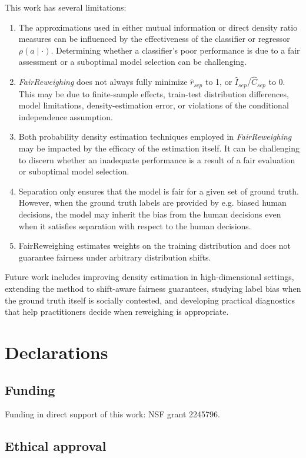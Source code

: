 This work has several limitations:
\begin{enumerate}[label=\textbf{Limitation \arabic*}]
\item The approximations used in either mutual information or direct density ratio measures can be influenced by the effectiveness of the classifier or regressor $\rho(a \mid \cdot)$. Determining whether a classifier's poor performance is due to a fair assessment or a suboptimal model selection can be challenging.
\item \emph{FairReweighing} does not always fully minimize $\hat{r}_{sep}$ to 1, or $\hat{I}_{sep}$/$\hat{C}_{sep}$ to 0. This may be due to finite-sample effects, train-test distribution differences, model limitations, density-estimation error, or violations of the conditional independence assumption.
\item Both probability density estimation techniques employed in \emph{FairReweighing} may be impacted by the efficacy of the estimation itself. It can be challenging to discern whether an inadequate performance is a result of a fair evaluation or suboptimal model selection.
\item Separation only ensures that the model is fair for a given set of ground truth. However, when the ground truth labels are provided by e.g. biased human decisions, the model may inherit the bias from the human decisions even when it satisfies separation with respect to the human decisions.
\item FairReweighing estimates weights on the training distribution and does not guarantee fairness under arbitrary distribution shifts.
\end{enumerate}
Future work includes improving density estimation in high-dimensional settings, extending the method to shift-aware fairness guarantees, studying label bias when the ground truth itself is socially contested, and developing practical diagnostics that help practitioners decide when reweighing is appropriate.

\section{Declarations}

\subsection{Funding}
Funding in direct support of this work: NSF grant 2245796.

\subsection{Ethical approval}


